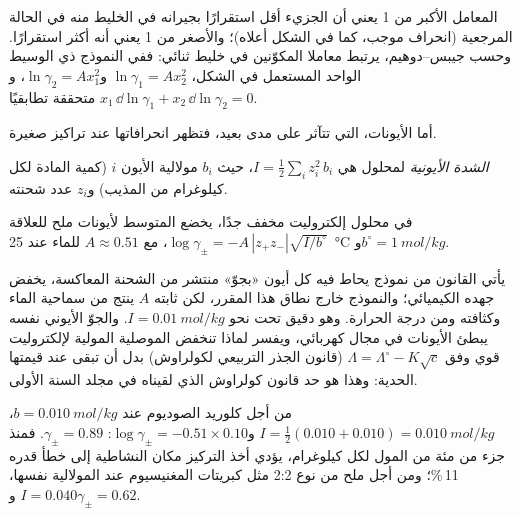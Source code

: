 المعامل الأكبر من 1 يعني أن الجزيء أقل استقرارًا بجيرانه في الخليط منه في
الحالة المرجعية (انحراف موجب، كما في الشكل أعلاه)؛ والأصغر من 1 يعني أنه
أكثر استقرارًا. وحسب جيبس--دوهيم، يرتبط معاملا المكوّنين في خليط ثنائي:
ففي النموذج ذي الوسيط الواحد المستعمل في الشكل، $\ln\gamma_1 = Ax_2^2$
و$\ln\gamma_2 = Ax_1^2$، 
و$x_1\,\dd\ln\gamma_1 + x_2\,\dd\ln\gamma_2 = 0$ متحققة تطابقيًا.

أما الأيونات، التي تتآثر على مدى بعيد، فتظهر انحرافاتها عند تراكيز
صغيرة.

\begin{definition}\label{def:b2:chemical-potential:ionic-strength}
\emph{الشدة الأيونية} لمحلول هي $I =
\frac12\sum_i z_i^2\,b_i$، حيث $b_i$ مولالية الأيون $i$ (كمية المادة لكل
كيلوغرام من المذيب) و$z_i$ عدد شحنته.
\end{definition}

\begin{proposition}\label{prop:b2:chemical-potential:debye-huckel}
في محلول إلكتروليت مخفف جدًا، يخضع  المتوسط لأيونات ملح
للعلاقة $\log\gamma_\pm = -A\,|z_+z_-|\sqrt{I/b^\circ}$، مع $A
\approx 0.51$ للماء عند \qty{25}{\celsius} و$b^\circ =
\qty{1}{mol/kg}$.
\end{proposition}
\admitted

\begin{remark}\label{rem:b2:chemical-potential:dh-range}
يأتي القانون من نموذج يحاط فيه كل أيون «بجوّ» منتشر من الشحنة المعاكسة،
يخفض جهده الكيميائي؛ والنموذج خارج نطاق هذا المقرر، لكن ثابته $A$ ينتج من
سماحية الماء وكثافته ومن درجة الحرارة. وهو دقيق تحت
نحو $I = \qty{0.01}{mol/kg}$. والجوّ الأيوني نفسه يبطئ الأيونات في
مجال كهربائي، ويفسر لماذا تنخفض الموصلية المولية لإلكتروليت قوي وفق
$\Lambda = \Lambda^\circ - K\sqrt c$ (قانون الجذر التربيعي لكولراوش)
بدل أن تبقى عند قيمتها الحدية: وهذا هو حد قانون كولراوش الذي لقيناه في
مجلد السنة الأولى.
\end{remark}

\begin{example}\label{ex:b2:chemical-potential:dh}
من أجل كلوريد الصوديوم عند $b = \qty{0.010}{mol/kg}$، $I = \frac12(0.010 + 0.010)
= \qty{0.010}{mol/kg}$ و$\log\gamma_\pm = -0.51 \times 0.10$: $\gamma_\pm
= 0.89$. فمنذ جزء من مئة من المول لكل كيلوغرام، يؤدي أخذ التركيز مكان
النشاطية إلى خطأ قدره 11\,\%؛ ومن أجل ملح من نوع 2:2 مثل كبريتات
المغنيسيوم عند المولالية نفسها، $I = 0.040$ و$\gamma_\pm = 0.62$.
\end{example}


